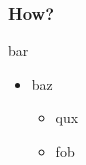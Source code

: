 \documentclass[aspectratio=1610]{beamer}
\begin{document}



\begin{frame}
	\frametitle{How?}

	\begin{block}{bar}
		\begin{itemize}
			\item baz
			\begin{itemize}
				\item qux
				\item fob
			\end{itemize}
		\end{itemize}
	\end{block}
\end{frame}
\end{document}
